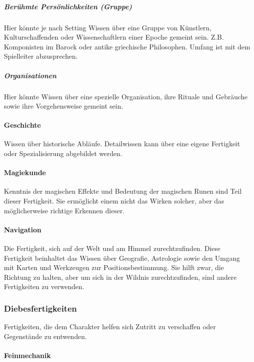 \documentclass{article}
\begin{document}
\subparagraph{Berühmte Persönlichkeiten (Gruppe)}

Hier könnte je nach Setting Wissen über eine Gruppe von Künstlern, Kulturschaffenden oder Wissenschaftlern einer
Epoche gemeint sein. Z.B. Komponisten im Barock oder antike griechische Philosophen. Umfang ist mit dem Spielleiter
abzusprechen.

\subparagraph{Organisationen}

Hier könnte Wissen über eine spezielle Organisation, ihre Rituale und Gebräuche sowie ihre Vorgehensweise gemeint sein.

\paragraph{Geschichte}

Wissen über historische Abläufe. Detailwissen kann über eine eigene Fertigkeit oder Spezialisierung abgebildet
werden.

\paragraph{Magiekunde}

Kenntnis der magischen Effekte und Bedeutung der magischen Runen sind Teil dieser Fertigkeit. Sie ermöglicht einem
nicht das Wirken solcher, aber das möglicherweise richtige Erkennen dieser.

\paragraph{Navigation}

Die Fertigkeit, sich auf der Welt und am Himmel zurechtzufinden. Diese Fertigkeit beinhaltet das Wissen über
Geografie, Astrologie sowie den Umgang mit Karten und Werkzeugen zur Positionsbestimmung. Sie hilft zwar, die Richtung
zu halten, aber um sich in der Wildnis zurechtzufinden, sind andere Fertigkeiten zu verwenden.

\subsubsection{Diebesfertigkeiten}

Fertigkeiten, die dem Charakter helfen sich Zutritt zu verschaffen oder Gegenstände zu entwenden.

\paragraph{Feinmechanik}
\end{document}
